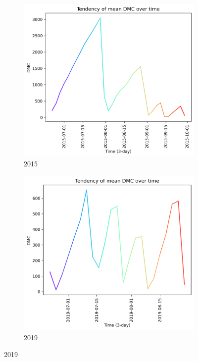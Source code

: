 \begin{figure}[h]
	\caption{DMC mean tendency graph}
	\centering
	\begin{subfigure}{0.49\textwidth}
		\centering
		\includegraphics[width=\textwidth]{graphs/2015/tendency/2015_tendency_graph_DMC.png}
		\caption{2015}
		\label{fig:mean_tendency_dmc_2015}
	\end{subfigure}
	\hfill
	\begin{subfigure}{0.49\textwidth}
		\centering
		\includegraphics[width=\textwidth]{graphs/2019/tendency/2019_tendency_graph_DMC.png}
		\caption{2019}
		\label{fig:mean_tendency_dmc_2019}
	\end{subfigure}
	\label{fig:mean_tendency_dmc}
\end{figure}

